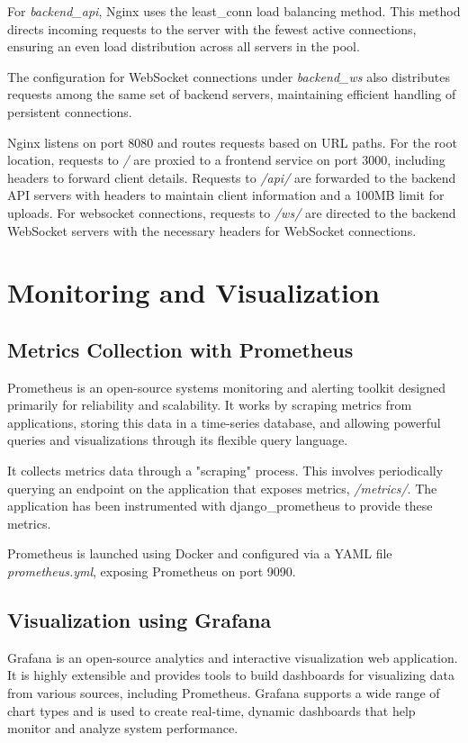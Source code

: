 For \textit{backend\_api}, Nginx uses the least\_conn load balancing method. This method directs incoming requests to the 
server with the fewest active connections, ensuring an even load distribution across all servers in the pool.

The configuration for WebSocket connections under \textit{backend\_ws} also distributes requests among the same set of
backend servers, maintaining efficient handling of persistent connections.

Nginx listens on port 8080 and routes requests based on URL paths.
For the root location, requests to \textit{/} are proxied to a frontend service on port 3000, including 
headers to forward client details. Requests to \textit{/api/} are forwarded to the backend API servers with headers 
to maintain client information and a 100MB limit for uploads.
For websocket connections, requests to \textit{/ws/} are directed to the backend WebSocket servers with the necessary 
headers for WebSocket connections.


\section{Monitoring and Visualization}
\subsection{Metrics Collection with Prometheus}
Prometheus \cite{rfc56} is an open-source systems monitoring and alerting toolkit designed primarily for reliability and scalability.
It works by scraping metrics from applications, storing this data in a time-series database, and allowing 
powerful queries and visualizations through its flexible query language.

It collects metrics data through a "scraping" process. This involves periodically querying an endpoint on 
the application that exposes metrics, \textit{/metrics/}. The application has been instrumented with 
django\_prometheus to provide these metrics.

Prometheus is launched using Docker and configured via a YAML file \textit{prometheus.yml}, exposing Prometheus 
on port 9090.


\subsection{Visualization using Grafana}
Grafana \cite{rfc55} is an open-source analytics and interactive visualization web application. It is highly extensible and 
provides tools to build dashboards for visualizing data from various sources, including Prometheus. Grafana supports 
a wide range of chart types and is used to create real-time, dynamic dashboards that help monitor and analyze system 
performance.

